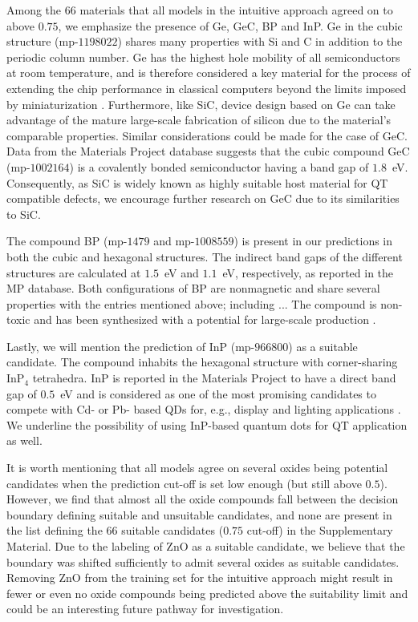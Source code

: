 \documentclass[superscriptaddress,unsortedaddress,
 amsmath,amssymb,
 aps,
]{revtex4-2}
\begin{document}
Among the $66$ materials that all models in the intuitive approach agreed on to above $0.75$, we emphasize the presence of Ge, GeC, BP and InP. Ge in the cubic structure (mp-$1198022$) shares many properties with Si and C in addition to the periodic column number. 
Ge has the highest hole mobility of all semiconductors at room temperature, and is therefore considered a key material for the process of extending the chip performance in classical computers beyond the limits imposed by miniaturization \cite{Scappucci2020}.  Furthermore, like SiC, device design based on Ge can take advantage of the mature  large-scale fabrication of silicon due to the material's comparable properties.  
Similar considerations could be made for the case of GeC. 
Data from the Materials Project database suggests that the cubic compound GeC (mp-$1002164$) is a covalently bonded semiconductor having a band gap of $1.8$~eV. 
Consequently, as SiC is widely known as highly suitable host material for QT compatible defects, we encourage further research on GeC due to its similarities to SiC. 

The compound BP (mp-$1479$ and mp-$1008559$) is present in our predictions in both the cubic and hexagonal structures. The indirect band gaps of the different structures are calculated at $1.5$~eV and $1.1$~eV,  respectively, as reported in the MP database. Both configurations of BP are nonmagnetic and share several properties with the entries mentioned above; including ... The compound is non-toxic and has been synthesized with a potential for large-scale production \cite{MukhanovVladimirA2016Umso}.

Lastly, we will mention the prediction of InP (mp-$966800$) as a suitable candidate. The compound inhabits the hexagonal structure with corner-sharing InP$_4$ tetrahedra. InP is reported in the Materials Project to have a direct band gap of $0.5$~eV and is considered as one of the most promising candidates to compete with Cd- or Pb- based QDs for, e.g., display and lighting applications  \cite{Zhang2020a, Won2019}. 
We underline the possibility of using InP-based quantum dots for QT application as well.  

It is worth mentioning that all models agree on several oxides being potential candidates when the prediction cut-off is set low enough (but still above $0.5$). However, we find that almost all the oxide compounds fall between the decision boundary defining suitable and unsuitable candidates, and none are present in the list defining the $66$ suitable candidates ($0.75$ cut-off) in the Supplementary Material. Due to the labeling of ZnO as a suitable candidate, we believe that the boundary was shifted sufficiently to admit several oxides as suitable candidates. 
Removing ZnO from the training set for the intuitive approach might result in fewer or even no oxide compounds being predicted above the suitability limit and could be an interesting future pathway for investigation. 
\end{document}
